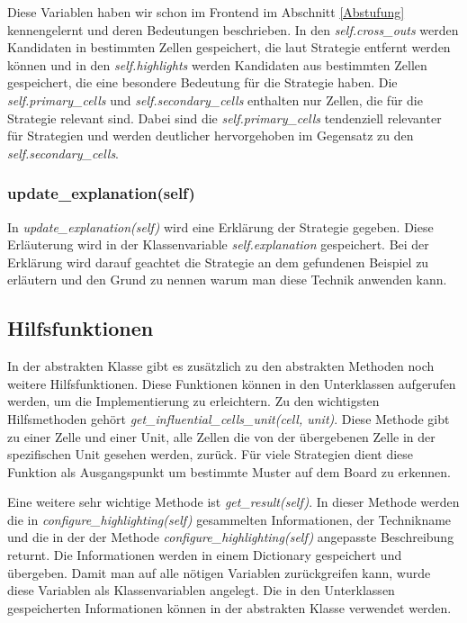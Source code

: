 Diese Variablen haben wir schon im Frontend im Abschnitt \ref{Abstufung} kennengelernt und deren Bedeutungen beschrieben. In den \textit{self.cross\_outs} werden Kandidaten in bestimmten Zellen gespeichert, die laut Strategie entfernt werden können und in den \textit{self.highlights} werden Kandidaten aus bestimmten Zellen gespeichert, die eine besondere Bedeutung für die Strategie haben. Die \textit{self.primary\_cells} und \textit{self.secondary\_cells} enthalten nur Zellen, die für die Strategie relevant sind. Dabei sind die \textit{self.primary\_cells} tendenziell relevanter für Strategien und werden deutlicher hervorgehoben im Gegensatz zu den \textit{self.secondary\_cells}.

\subsubsection{update\_explanation(self)}
In \textit{update\_explanation(self)} wird eine Erklärung der Strategie gegeben. Diese Erläuterung wird in der Klassenvariable \textit{self.explanation} gespeichert. Bei der Erklärung wird darauf geachtet die Strategie an dem gefundenen Beispiel zu erläutern und den Grund zu nennen warum man diese Technik anwenden kann.

\subsection{Hilfsfunktionen}

In der abstrakten Klasse gibt es zusätzlich zu den abstrakten Methoden noch weitere Hilfsfunktionen. Diese Funktionen können in den Unterklassen aufgerufen werden, um die Implementierung zu erleichtern. Zu den wichtigsten Hilfsmethoden gehört \textit{get\_influential\_cells\_unit(cell, unit)}. Diese Methode gibt zu einer Zelle und einer Unit, alle Zellen die von der übergebenen Zelle in der spezifischen Unit gesehen werden, zurück. Für viele Strategien dient diese Funktion als Ausgangspunkt um bestimmte Muster auf dem Board zu erkennen.

Eine weitere sehr wichtige Methode ist \textit{get\_result(self)}. In dieser Methode werden die in \textit{configure\_highlighting(self)} gesammelten Informationen, der Technikname und die in der der Methode \textit{configure\_highlighting(self)} angepasste Beschreibung returnt. Die Informationen werden in einem Dictionary gespeichert und übergeben. Damit man auf alle nötigen Variablen zurückgreifen kann, wurde diese Variablen als Klassenvariablen angelegt. Die in den Unterklassen gespeicherten Informationen können in der abstrakten Klasse verwendet werden.

